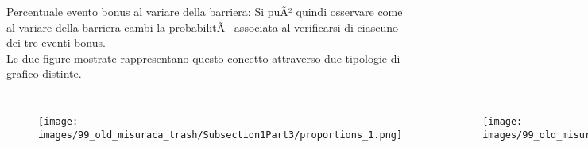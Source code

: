 \begin{frame} 

	\begin{block}{Percentuale evento bonus al variare della barriera:}
		Si puÃ² quindi osservare come al variare della barriera cambi la probabilitÃ  associata al verificarsi di ciascuno dei tre eventi bonus.\\
		Le due figure mostrate rappresentano questo concetto attraverso due tipologie di grafico distinte.
	\end{block}

	\begin{columns}
	
		\begin{figure}[!htbp]
			\centering
			\texttt{[image: images/99\_old\_misuraca\_trash/Subsection1Part3/proportions\_1.png]}
		\end{figure}
		
		\begin{figure}[!htbp]
			\centering
			\texttt{[image: images/99\_old\_misuraca\_trash/Subsection1Part3/proportions\_2.png]}
		\end{figure}
	
	\end{columns}
\end{frame}
